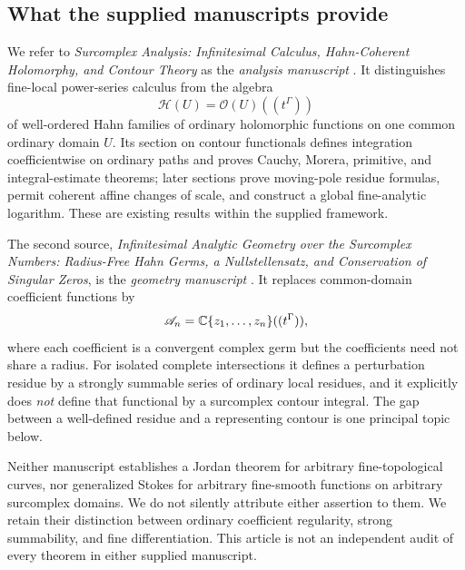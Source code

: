 \documentclass[11pt,letterpaper]{article}
\theoremstyle{definition}
\theoremstyle{remark}
\newcommand{\HH}{\mathcal H}\newcommand{\A}{\mathscr A}\newcommand{\OO}{\mathcal O}
\numberwithin{equation}{section}
\begin{document}
\subsection{What the supplied manuscripts provide}
We refer to \emph{Surcomplex Analysis: Infinitesimal Calculus, Hahn-Coherent
Holomorphy, and Contour Theory} as the \emph{analysis manuscript} \cite{Analysis}.
It distinguishes fine-local power-series calculus from the algebra
\[
  \HH(U)=\OO(U)((t^\Gamma))
\]
of well-ordered Hahn families of ordinary holomorphic functions on one common
ordinary domain $U$. Its section on contour functionals defines integration
coefficientwise on ordinary paths and proves Cauchy, Morera, primitive, and
integral-estimate theorems; later sections prove moving-pole residue formulas,
permit coherent affine changes of scale, and construct a global fine-analytic
logarithm. These are existing results within the supplied framework.

The second source, \emph{Infinitesimal Analytic Geometry over the Surcomplex
Numbers: Radius-Free Hahn Germs, a Nullstellensatz, and Conservation of Singular
Zeros}, is the \emph{geometry manuscript} \cite{Geometry}. It replaces
common-domain coefficient functions by
\[
  \A_n=\C\{z_1,\ldots,z_n\}((t^\Gamma)),
\]
where each coefficient is a convergent complex germ but the coefficients need not
share a radius. For isolated complete intersections it defines a perturbation
residue by a strongly summable series of ordinary local residues, and it
explicitly does \emph{not} define that functional by a surcomplex contour
integral. The gap between a well-defined residue and a representing contour is one
principal topic below.

Neither manuscript establishes a Jordan theorem for arbitrary fine-topological
curves, nor generalized Stokes for arbitrary fine-smooth functions on arbitrary
surcomplex domains. We do not silently attribute either assertion to them. We
retain their distinction between ordinary coefficient regularity, strong
summability, and fine differentiation. This article is not an independent audit of
every theorem in either supplied manuscript.
\end{document}
